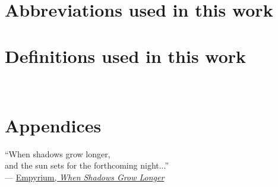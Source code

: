 \documentclass[12pt, twoside, openright]{report}
\begin{document}
\cleardoublepage

\newpage
\thispagestyle{plain}
~\newpage


\smaller{


}


\chapter*{\vspace*{-4cm}Abbreviations used in this work}
\label{chapter: abbreviations}



\chapter*{\vspace*{-4cm}Definitions used in this work}
\label{chapter: definitions}


\newpage
\thispagestyle{plain}
~\newpage


\chapter*{Appendices}
\vspace*{2cm}
\vbox{\large``When shadows grow longer,\\
and the sun sets for the forthcoming night...''\\

--- \href{https://empyrium.bandcamp.com/album/where-at-night-the-wood-grouse-plays}{Empyrium, \textit{When Shadows Grow Longer}}}

\newpage

\appendix

\normalsize
\end{document}
